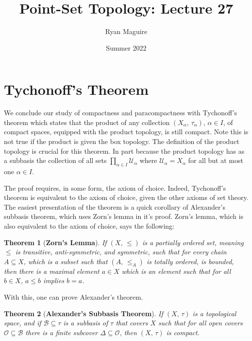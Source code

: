 \documentclass{article}
\title{Point-Set Topology: Lecture 27}
\author{Ryan Maguire}
\date{Summer 2022}
\theoremstyle{plain}
\newtheorem{theorem}{Theorem}[section]
\theoremstyle{normal}
\begin{document}
    \maketitle
    \section{Tychonoff's Theorem}
        We conclude our study of compactness and paracompactness with
        Tychonoff's theorem which states that the product of any collection
        $(X_{\alpha},\,\tau_{\alpha})$, $\alpha\in{I}$, of
        compact spaces, equipped with the product topology, is still compact.
        Note this is not true if the product is given the box topology. The
        definition of the product topology is crucial for this theorem. In part
        because the product topology has as a subbasis the collection of all
        sets $\prod_{\alpha\in{I}}\mathcal{U}_{\alpha}$ where
        $\mathcal{U}_{\alpha}=X_{\alpha}$ for all but at most one
        $\alpha\in{I}$.
        \par\hfill\par
        The proof requires, in some form, the axiom of choice.
        Indeed, Tychonoff's theorem is equivalent to the axiom of choice, given
        the other axioms of set theory. The easiest presentation of the
        theorem is a quick corollary of Alexander's subbasis theorem, which
        uses Zorn's lemma in it's proof. Zorn's lemma, which is also equivalent
        to the axiom of choice, says the following:
        \begin{theorem}[\textbf{Zorn's Lemma}]
            If $(X,\,\leq)$ is a partially ordered set, meaning
            $\leq$ is transitive, anti-symmetric, and symmetric, such that
            for every chain $A\subseteq{X}$, which is a subset such that
            $(A,\,\leq_{A})$ is totally ordered, is bounded, then there is a
            maximal element $a\in{X}$ which is an element such that for all
            $b\in{X}$, $a\leq{b}$ implies $b=a$.
        \end{theorem}
        With this, one can prove Alexander's theorem.
        \begin{theorem}[\textbf{Alexander's Subbasis Theorem}]
            If $(X,\,\tau)$ is a topological space, and if
            $\mathcal{B}\subseteq\tau$ is a subbasis of $\tau$ that covers $X$
            such that for all open covers $\mathcal{O}\subseteq\mathcal{B}$
            there is a finite subcover $\Delta\subseteq\mathcal{O}$, then
            $(X,\,\tau)$ is compact.
        \end{theorem}
\end{document}
